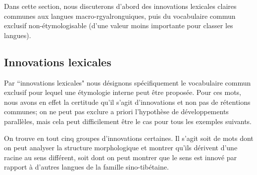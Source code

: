 \documentclass[oldfontcommands,twoside,a4paper,11pt,draft]{memoir}
\begin{document}
Dans cette section, nous discuterons d'abord des innovations lexicales claires communes aux langues macro-rgyalronguiques, puis du vocabulaire commun exclusif non-étymologisable (d'une valeur moins importante pour classer les langues).

\subsection{Innovations lexicales}
Par ``innovations lexicales" nous désignons spécifiquement le vocabulaire commun exclusif pour lequel une étymologie interne peut être proposée. Pour ces mots, nous avons en effet la certitude qu'il s'agit d'innovations et non pas de rétentions communes; on ne peut pas exclure a priori l'hypothèse de développements parallèles, mais cela  peut difficilement être le cas pour tous les exemples suivants.

On trouve en tout cinq groupes d'innovations certaines. Il s'agit soit de mots dont on peut   analyser la structure morphologique et montrer qu'ils dérivent d'une racine au sens différent, soit dont on peut  montrer que le sens est innové par rapport à d'autres langues de la famille sino-tibétaine. 
\end{document}
